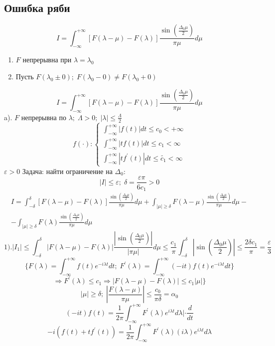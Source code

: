 \subsection{Ошибка ряби}
\[I = \int_{-\infty}^{+\infty} [F(\lambda - \mu) - F(\lambda)]\frac{\sin(\frac{\Delta_0\mu}{2})}{\pi\mu}d\mu\]
\begin{enumerate} 
   \item $F$ непрерывна при $\lambda = \lambda_0$
   \item Пусть $F(\lambda_0 \pm 0) ;\; F(\lambda_0 - 0) \neq F(\lambda_0 + 0)$
\end{enumerate}
\[I = \int_{-\infty}^{+\infty} [F(\lambda - \mu) - F(\lambda)]\frac{\sin(\frac{\Delta_0\mu}{2})}{\pi\mu}d\mu\]
a). $F$ непрерывна по $\lambda;\; \Lambda > 0;\; |\lambda| \leq \frac{\Lambda}{2}$
\begin{equation*}
f(\cdot) :
 \begin{cases}
   \int_{-\infty}^{+\infty} |f(t)|dt \leq c_0 < +\infty\\
   \int_{-\infty}^{+\infty} |tf(t)|dt \leq c_1 < \infty\\
   \int_{-\infty}^{+\infty} |tf^{'}(t)|dt \leq \widetilde{c_1} < \infty
 \end{cases}
\end{equation*}
$\varepsilon > 0$ Задача: найти ограничение на $\Delta_0:$
\[|I| \leq \varepsilon;\; \delta = \frac{\varepsilon\pi}{6c_1} > 0\]
\begin{multline}
I = \int_{-\delta}^{\delta} [F(\lambda - \mu) - F(\lambda)]\frac{\sin(\frac{\Delta_0\mu}{2})}{\pi\mu}d\mu + \int_{|\mu| \geq \delta} F(\lambda - \mu)\frac{\sin(\frac{\Delta_0\mu}{2})}{\pi\mu}d\mu - \\
- \int_{|\mu| \geq \delta}F(\lambda)\frac{\sin(\frac{\Delta_0\mu}{2})}{\pi\mu}d\mu
\end{multline}
\[1). |I_1| \leq \int_{-\delta}^{\delta} |F(\lambda - \mu) - F(\lambda)|\frac{|\sin(\frac{\Delta_0\mu}{2})|}{|\pi\mu|}d\mu \leq \frac{c_1}{\pi} \int_{-\delta}^{\delta} |\sin(\frac{\Delta_0\mu}{2})| \leq \frac{2\delta c_1}{\pi} = \frac{\varepsilon}{3}\]
\[\{ F(\lambda) = \int_{-\infty}^{+\infty} f(t)e^{-i\lambda t}dt;\;F^{'}(\lambda) = \int_{-\infty}^{+\infty} (-it)f(t)e^{-i\lambda t}dt\}\]
\[\Rightarrow F^{'}(\lambda) \leq c_1 \Rightarrow |F(\lambda - \mu) - F(\lambda)| \leq c_1|\mu|\}\]
\[|\mu| \geq \delta;\; |\frac{F(\lambda - \mu)}{\pi\mu}| \leq \frac{c_0}{\pi\delta} = \alpha_0\]
\[(-it)f(t) = \frac{1}{2\pi}\int_{-\infty}^{+\infty} F^{'}(\lambda)e^{i\lambda t}d\lambda| \cdot \frac{d}{dt}\]
\[-i(f(t) + tf^{'}(t)) = \frac{1}{2\pi}\int_{-\infty}^{+\infty} F^{'}(\lambda)(i\lambda)e^{i\lambda t}d\lambda\]

